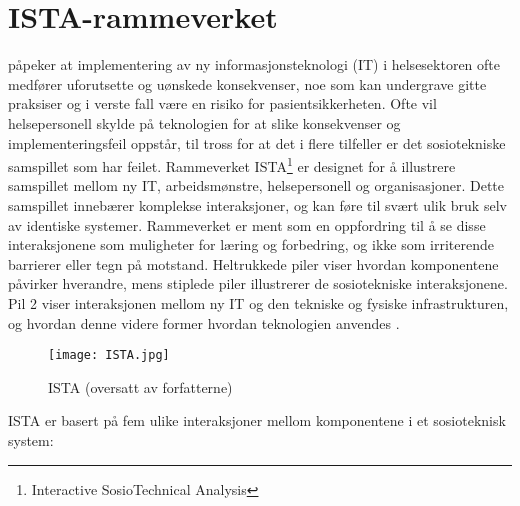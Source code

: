 \section{ISTA-rammeverket}
\label{sec:ista-rammeverket}
\citet{Harrison} påpeker at implementering av ny informasjonsteknologi (IT) i helsesektoren ofte medfører uforutsette og uønskede konsekvenser, noe som kan undergrave gitte praksiser og i verste fall være en risiko for pasientsikkerheten. Ofte vil helsepersonell skylde på teknologien for at slike konsekvenser og implementeringsfeil oppstår, til tross for at det i flere tilfeller er det sosiotekniske samspillet som har feilet. Rammeverket ISTA\footnote{Interactive SosioTechnical Analysis} er designet for å illustrere samspillet mellom ny IT, arbeidsmønstre, helsepersonell og organisasjoner. Dette samspillet innebærer komplekse interaksjoner, og kan føre til svært ulik bruk selv av identiske systemer. Rammeverket er ment som en oppfordring til å se disse interaksjonene som muligheter for læring og forbedring, og ikke som irriterende barrierer eller tegn på motstand. Heltrukkede piler viser hvordan komponentene påvirker hverandre, mens stiplede piler illustrerer de sosiotekniske interaksjonene. Pil 2 viser interaksjonen mellom ny IT og den tekniske og fysiske infrastrukturen, og hvordan denne videre former hvordan teknologien anvendes \citep{Harrison}.

\begin{figure}[H]
\centering
\texttt{[image: ISTA.jpg]}
\caption{ISTA \citep{Harrison} (oversatt av forfatterne)}
\label{fig:ISTA}
\end{figure}

\noindent
ISTA er basert på fem ulike interaksjoner mellom komponentene i et sosioteknisk system:  

